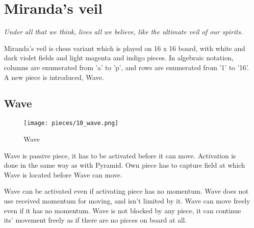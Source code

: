 

\chapter*{Miranda's veil}

\begin{flushright}
\parbox{0.8\textwidth}{
\emph{Under all that we think, lives all we believe, like the ultimate veil of our spirits. \\
 } }
\end{flushright}

\noindent
Miranda's veil is chess variant which is played on 16 x 16 board, with
white and dark violet fields and light magenta and indigo pieces. In
algebraic notation, columns are enumerated from 'a' to 'p', and rows
are enumerated from '1' to '16'. A new piece is introduced, Wave.

\clearpage %

\section*{Wave}

\noindent
\begin{wrapfigure}[12]{l}{0.4\textwidth}
\centering
\texttt{[image: pieces/10\_wave.png]}
\caption{Wave}
\label{fig:10_wave}
\end{wrapfigure}
Wave is passive piece, it has to be activated before it can move. Activation
is done in the same way as with Pyramid. Own piece has to capture field at
which Wave is located before Wave can move.

Wave can be activated even if activating piece has no momentum. Wave does not
use received momentum for moving, and isn't limited by it.
Wave can move freely even if it has no momentum. Wave is not blocked by any piece,
it can continue its' movement freely as if there are no pieces on board at all.

